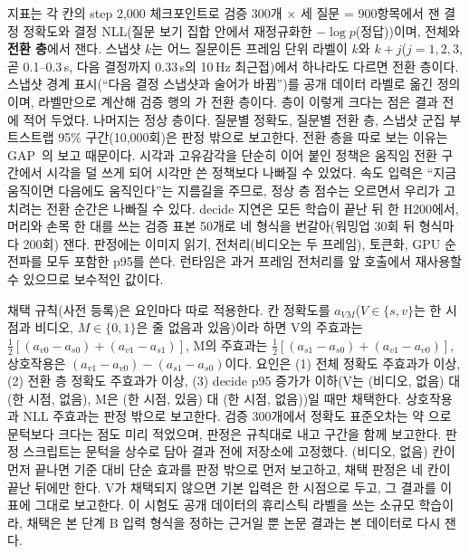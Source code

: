 지표는 각 칸의 step 2,000 체크포인트로 검증 300개 $\times$ 세 질문 = 900항목에서 잰 결정 정확도와 결정 NLL(질문 보기 집합 안에서 재정규화한 $-\log p$(정답))이며, 전체와 \textbf{전환 층}에서 잰다. 스냅샷 $k$는 어느 질문이든 프레임 단위 라벨이 $k$와 $k+j$($j=1,2,3$, 곧 0.1--0.3\,s, 다음 결정까지 0.33\,s의 10\,Hz 최근접)에서 하나라도 다르면 전환 층이다. 스냅샷 경계 표시(``다음 결정 스냅샷과 술어가 바뀜'')를 공개 데이터 라벨로 옮긴 정의이며, 라벨만으로 계산해 검증 행의 가 전환 층이다. 층이 이렇게 크다는 점은 결과 전에 적어 두었다. 나머지는 정상 층이다. 질문별 정확도, 질문별 전환 층, 스냅샷 군집 부트스트랩 95\% 구간(10,000회)은 판정 밖으로 보고한다. 전환 층을 따로 보는 이유는 GAP~\cite{gap2026}의 보고 때문이다. 시각과 고유감각을 단순히 이어 붙인 정책은 움직임 전환 구간에서 시각을 덜 쓰게 되어 시각만 쓴 정책보다 나빠질 수 있었다. 속도 입력은 ``지금 움직이면 다음에도 움직인다''는 지름길을 주므로, 정상 층 점수는 오르면서 우리가 고치려는 전환 순간은 나빠질 수 있다. decide 지연은 모든 학습이 끝난 뒤 한 H200에서, 머리와 손목 한 대를 쓰는 검증 표본 50개로 네 형식을 번갈아(워밍업 30회 뒤 형식마다 200회) 잰다. 판정에는 이미지 읽기, 전처리(비디오는 두 프레임), 토큰화, GPU 순전파를 모두 포함한 p95를 쓴다. 런타임은 과거 프레임 전처리를 앞 호출에서 재사용할 수 있으므로 보수적인 값이다.

채택 규칙(사전 등록)은 요인마다 따로 적용한다. 칸 정확도를 $a_{VM}$($V\in\{s,v\}$는 한 시점과 비디오, $M\in\{0,1\}$은 줄 없음과 있음)이라 하면 V의 주효과는 $\tfrac12[(a_{v0}-a_{s0})+(a_{v1}-a_{s1})]$, M의 주효과는 $\tfrac12[(a_{s1}-a_{s0})+(a_{v1}-a_{v0})]$, 상호작용은 $(a_{v1}-a_{v0})-(a_{s1}-a_{s0})$이다. 요인은 (1) 전체 정확도 주효과가  이상, (2) 전환 층 정확도 주효과가  이상, (3) decide p95 증가가  이하(V는 (비디오, 없음) 대 (한 시점, 없음), M은 (한 시점, 있음) 대 (한 시점, 없음))일 때만 채택한다. 상호작용과 NLL 주효과는 판정 밖으로 보고한다. 검증 300개에서 정확도 표준오차는 약 으로 문턱보다 크다는 점도 미리 적었으며, 판정은 규칙대로 내고 구간을 함께 보고한다. 판정 스크립트는 문턱을 상수로 담아 결과 전에 저장소에 고정했다. (비디오, 없음) 칸이 먼저 끝나면 기준 대비 단순 효과를 판정 밖으로 먼저 보고하고, 채택 판정은 네 칸이 끝난 뒤에만 한다. V가 채택되지 않으면 기본 입력은 한 시점으로 두고, 그 결과를 이 표에 그대로 보고한다. 이 시험도 공개 데이터의 휴리스틱 라벨을 쓰는 소규모 학습이라, 채택은 본 단계 B 입력 형식을 정하는 근거일 뿐 논문 결과는 본 데이터로 다시 잰다.

